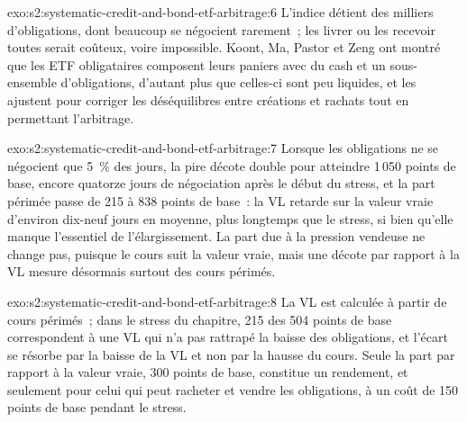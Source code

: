 \begin{solution}{exo:s2:systematic-credit-and-bond-etf-arbitrage:6}
L'indice détient des milliers d'obligations, dont beaucoup se négocient rarement~; les livrer ou les recevoir toutes serait coûteux, voire impossible. Koont, Ma, Pastor
et Zeng ont montré que les ETF obligataires composent leurs paniers avec du cash et un sous-ensemble d'obligations, d'autant plus que celles-ci sont peu liquides, et les ajustent pour corriger les déséquilibres
entre créations et rachats tout en permettant l'arbitrage.
\end{solution}

\begin{solution}{exo:s2:systematic-credit-and-bond-etf-arbitrage:7}
Lorsque les obligations ne se négocient que 5~\% des jours, la pire décote double pour atteindre 1\,050 points de base, encore quatorze jours de négociation après le début du stress, et la part périmée
passe de 215 à 838 points de base~: la VL retarde sur la valeur vraie d'environ dix-neuf jours en moyenne, plus longtemps que le stress, si bien qu'elle manque l'essentiel de
l'élargissement. La part due à la pression vendeuse ne change pas, puisque le cours suit la valeur vraie, mais une décote par rapport à la VL mesure désormais surtout des cours
périmés.
\end{solution}

\begin{solution}{exo:s2:systematic-credit-and-bond-etf-arbitrage:8}
La VL est calculée à partir de cours périmés~; dans le stress du chapitre, 215 des 504 points de base correspondent à une VL qui n'a pas rattrapé la baisse des obligations, et
l'écart se résorbe par la baisse de la VL et non par la hausse du cours. Seule la part par rapport à la valeur vraie, 300 points de base, constitue un rendement, et seulement pour
celui qui peut racheter et vendre les obligations, à un coût de 150 points de base pendant le stress.
\end{solution}

